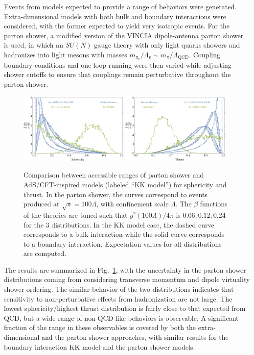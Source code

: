 Events from models expected to provide a range of behaviors were generated. Extra-dimensional models with both bulk and boundary interactions were considered, with the former expected to yield very isotropic events. For the parton shower, a modified version of the VINCIA dipole-antenna parton shower~\cite{Fischer:2016vfv} is used, in which an $SU(N)$ gauge theory with only light quarks showers and hadronizes into light mesons with masses $m_{\pi_v}/\Lambda_v \sim m_\pi/\Lambda_\text{QCD}$. Coupling boundary conditions and one-loop running were then varied while adjusting shower cutoffs to ensure that couplings remain perturbative throughout the parton shower.

\begin{figure}[tb!]
	\centering
	\includegraphics[width=0.48\textwidth]{figures/DS_comparison_sphericity.pdf}
	\hspace{5pt}
	\includegraphics[width=0.48\textwidth]{figures/DS_comparison_thrust.pdf}
	\caption{Comparison between accessible ranges of parton shower and AdS/CFT-inspired models (labeled ``KK model'') for sphericity and thrust. In the parton shower, the curves correspond to events produced at $\sqrt{s} = 100\Lambda$, with confinement scale $\Lambda$. The $\beta$ functions of the theories are tuned such that $g^2(100\Lambda)/4\pi$ is $0.06, 0.12, 0.24$ for the 3 distributions. In the KK model case, the dashed curve corresponds to a bulk interaction while the solid curve corresponds to a boundary interaction. Expectation values for all distributions are computed.}
	\label{fig:compplots}
\end{figure}

The results are summarized in Fig.~\ref{fig:compplots}, with the uncertainty in the parton shower distributions coming from considering transverse momentum and dipole virtuality shower ordering. The similar behavior of the two distributions indicates that sensitivity to non-perturbative effects from hadronization are not large.  The lowest sphericity/highest thrust distribution is fairly close to that expected from QCD, but a wide range of non-QCD-like behaviors is observable. A significant fraction of the range in these observables is covered by both the extra-dimensional and the parton shower approaches, with similar results for the boundary interaction KK model and the parton shower models.

